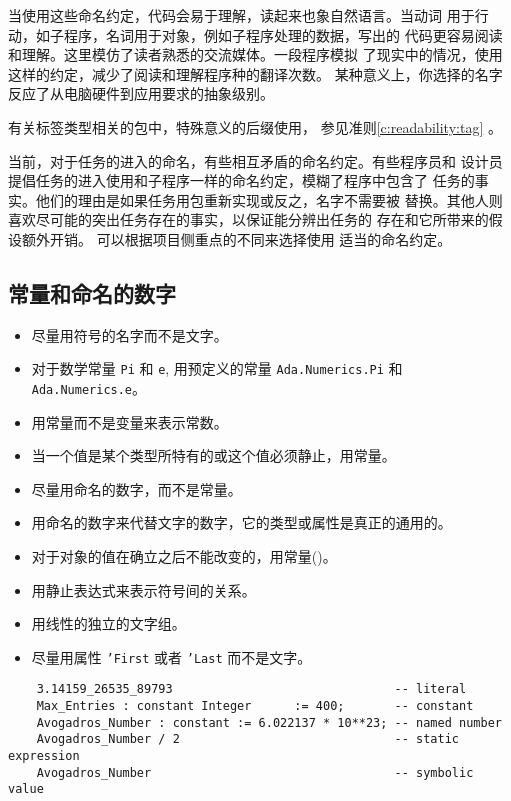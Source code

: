 \begin{blockindent}
当使用这些命名约定，代码会易于理解，读起来也象自然语言。当动词
用于行动，如子程序，名词用于对象，例如子程序处理的数据，写出的
代码更容易阅读和理解。这里模仿了读者熟悉的交流媒体。一段程序模拟
了现实中的情况，使用这样的约定，减少了阅读和理解程序种的翻译次数。
某种意义上，你选择的名字反应了从电脑硬件到应用要求的抽象级别。

有关标签类型相关的包中，特殊意义的后缀使用，
参见准则\ref{c:readability:tag} 。
\end{blockindent}

\begin{blockindent}
当前，对于任务的进入的命名，有些相互矛盾的命名约定。有些程序员和
设计员提倡任务的进入使用和子程序一样的命名约定，模糊了程序中包含了
任务的事实。他们的理由是如果任务用包重新实现或反之，名字不需要被
替换。其他人则喜欢尽可能的突出任务存在的事实，以保证能分辨出任务的
存在和它所带来的假设额外开销。 可以根据项目侧重点的不同来选择使用
适当的命名约定。
\end{blockindent}

\subsection{常量和命名的数字}
\begin{itemize}
    \item 尽量用符号的名字而不是文字。
    \item 对于数学常量 \texttt{Pi} 和 \texttt{e},
用预定义的常量 \texttt{Ada.Numerics.Pi} 和 \texttt{Ada.Numerics.e}。
    \item 用常量而不是变量来表示常数。
    \item 当一个值是某个类型所特有的或这个值必须静止，用常量。
    \item 尽量用命名的数字，而不是常量。
    \item 用命名的数字来代替文字的数字，它的类型或属性是真正的通用的。
    \item 对于对象的值在确立之后不能改变的，用常量(\cite{united87})。
    \item 用静止表达式来表示符号间的关系。
    \item 用线性的独立的文字组。
    \item 尽量用属性 \texttt{'First} 或者 \texttt{'Last} 而不是文字。
\end{itemize}


\begin{lstlisting}
    3.14159_26535_89793                               -- literal
    Max_Entries : constant Integer      := 400;       -- constant
    Avogadros_Number : constant := 6.022137 * 10**23; -- named number
    Avogadros_Number / 2                              -- static expression
    Avogadros_Number                                  -- symbolic value
\end{lstlisting}


